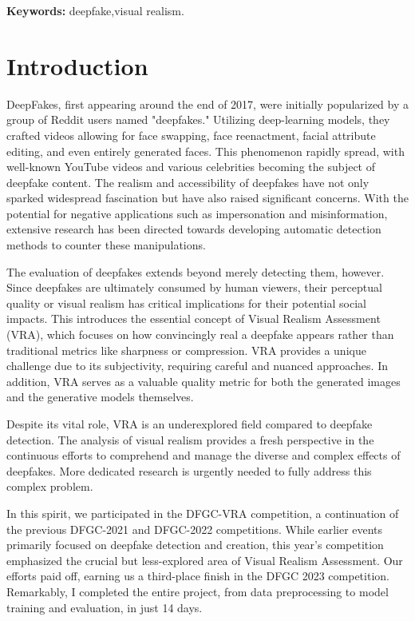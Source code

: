 \documentclass[a4paper,12pt,openright]{book}
\newcommand{\tkeywordsEn}{deepfake,visual realism}
\newcommand{\clearemptydoublepage}{\newpage{\pagestyle{empty}\cleardoublepage}}
\begin{document}
\noindent\textbf{Keywords:} \tkeywordsEn.
\clearemptydoublepage

\mainmatter
\setcounter{page}{1}
\pagestyle{fancy}

\chapter{Introduction}
DeepFakes, first appearing around the end of 2017, were initially popularized by a group of Reddit users named "deepfakes." Utilizing deep-learning models, they crafted videos allowing for face swapping, face reenactment, facial attribute editing, and even entirely generated faces. This phenomenon rapidly spread, with well-known YouTube videos and various celebrities becoming the subject of deepfake content. The realism and accessibility of deepfakes have not only sparked widespread fascination but have also raised significant concerns. With the potential for negative applications such as impersonation and misinformation, extensive research has been directed towards developing automatic detection methods to counter these manipulations.

The evaluation of deepfakes extends beyond merely detecting them, however. Since deepfakes are ultimately consumed by human viewers, their perceptual quality or visual realism has critical implications for their potential social impacts. This introduces the essential concept of Visual Realism Assessment (VRA), which focuses on how convincingly real a deepfake appears rather than traditional metrics like sharpness or compression. VRA provides a unique challenge due to its subjectivity, requiring careful and nuanced approaches. In addition, VRA serves as a valuable quality metric for both the generated images and the generative models themselves.

Despite its vital role, VRA is an underexplored field compared to deepfake detection. The analysis of visual realism provides a fresh perspective in the continuous efforts to comprehend and manage the diverse and complex effects of deepfakes. More dedicated research is urgently needed to fully address this complex problem.

In this spirit, we participated in the DFGC-VRA competition, a continuation of the previous DFGC-2021 and DFGC-2022 competitions. While earlier events primarily focused on deepfake detection and creation, this year's competition emphasized the crucial but less-explored area of Visual Realism Assessment. Our efforts paid off, earning us a third-place finish in the DFGC 2023 competition.  Remarkably, I completed the entire project, from data preprocessing to model training and evaluation, in just 14 days.
\end{document}
